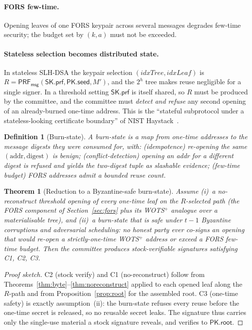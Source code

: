 \documentclass[11pt,a4paper]{article}
\newtheorem{theorem}{Theorem}
\newtheorem{definition}{Definition}
\newcommand{\PRFmsg}{\mathsf{PRF}_{\mathsf{msg}}}
\newcommand{\skprf}{\mathsf{SK.prf}}
\newcommand{\pkseed}{\mathsf{PK.seed}}
\newcommand{\pkroot}{\mathsf{PK.root}}
\begin{document}
\paragraph{FORS few-time.} Opening leaves of one FORS keypair across several
messages degrades few-time security; the budget set by $(k, a)$ must not be
exceeded.

\paragraph{Stateless selection becomes distributed state.} In stateless SLH-DSA the
keypair selection $(\mathit{idxTree}, \mathit{idxLeaf})$ is
$R = \PRFmsg(\skprf, \pkseed, M')$, and the $2^h$ tree makes reuse negligible for a
single signer. In a threshold setting $\skprf$ is itself shared, so $R$ must be
produced by the committee, and the committee must \emph{detect and refuse} any second
opening of an already-burned one-time address. This is the ``stateful subprotocol
under a stateless-looking certificate boundary'' of NIST Haystack~\cite{haystack}.

\begin{definition}[Burn-state]
A burn-state is a map from one-time addresses to the message digests they were
consumed for, with: \emph{(idempotence)} re-opening the same $(\text{addr},
\text{digest})$ is benign; \emph{(conflict-detection)} opening an addr for a
\emph{different} digest is refused and yields the two-digest tuple as slashable
evidence; \emph{(few-time budget)} FORS addresses admit a bounded reuse count.
\end{definition}

\begin{theorem}[Reduction to a Byzantine-safe burn-state]
\label{thm:reduction}
Assume (i)~a no-reconstruct threshold opening of every one-time leaf on the
$R$-selected path (the FORS component of Section~\ref{sec:fors} plus its WOTS$^+$
analogue over a materialisable tree), and (ii)~a burn-state that is \emph{safe} under
$t-1$ Byzantine corruptions and adversarial scheduling: no honest party ever
co-signs an opening that would re-open a strictly-one-time WOTS$^+$ address or exceed
a FORS few-time budget. Then the committee produces stock-verifiable signatures
satisfying C1, C2, C3.
\end{theorem}
\begin{proof}[Proof sketch]
C2 (stock verify) and C1 (no-reconstruct) follow from
Theorems~\ref{thm:byte}--\ref{thm:noreconstruct} applied to each opened leaf along the
$R$-path and from Proposition~\ref{prop:root} for the assembled root. C3 (one-time
safety) is exactly assumption~(ii): the burn-state refuses every reuse before the
one-time secret is released, so no reusable secret leaks. The signature thus carries
only the single-use material a stock signature reveals, and verifies to $\pkroot$.
\end{proof}
\end{document}
